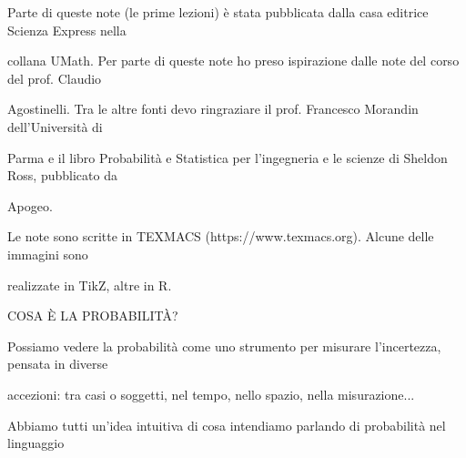 \documentclass[a4paper,portrait,12pt]{article}
\begin{document}
\begin{flushleft}
Parte di queste note (le prime lezioni) \`{e} stata pubblicata dalla casa editrice Scienza Express nella
\end{flushleft}


\begin{flushleft}
collana UMath. Per parte di queste note ho preso ispirazione dalle note del corso del prof. Claudio
\end{flushleft}


\begin{flushleft}
Agostinelli. Tra le altre fonti devo ringraziare il prof. Francesco Morandin dell'Universit\`{a} di
\end{flushleft}


\begin{flushleft}
Parma e il libro Probabilit\`{a} e Statistica per l'ingegneria e le scienze di Sheldon Ross, pubblicato da
\end{flushleft}


\begin{flushleft}
Apogeo.
\end{flushleft}


\begin{flushleft}
Le note sono scritte in TEXMACS (https://www.texmacs.org). Alcune delle immagini sono
\end{flushleft}


\begin{flushleft}
realizzate in TikZ, altre in R.
\end{flushleft}





\begin{flushleft}
COSA \`{E} LA PROBABILIT\`{A}?
\end{flushleft}


\begin{flushleft}
Possiamo vedere la probabilit\`{a} come uno strumento per misurare l'incertezza, pensata in diverse
\end{flushleft}


\begin{flushleft}
accezioni: tra casi o soggetti, nel tempo, nello spazio, nella misurazione...
\end{flushleft}


\begin{flushleft}
Abbiamo tutti un'idea intuitiva di cosa intendiamo parlando di probabilit\`{a} nel linguaggio
\end{flushleft}
\end{document}
